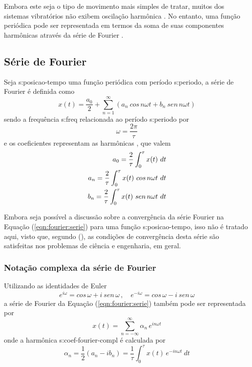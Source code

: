 \documentclass[12pt,openright,oneside,a4paper,
	chapter=TITLE,section=TITLE,
	english,brazil]{abntex2}
\begin{document}
	Embora este seja o tipo de movimento mais simples de tratar, muitos dos sistemas vibratórios não exibem oscilação harmônica \cite{rao:2008}. No entanto, uma função periódica pode ser representada em termos da soma de suas componentes harmônicas através da série de Fourier \cite{clark:1972}.
	
	\subsection{Série de Fourier}
	Seja \gls{s:posicao-tempo} uma função periódica com período \gls{s:periodo}, a série de Fourier é definida como \cite{spiegel:1977}
	\begin{equation}\label{eqn:fourier:serie}
		x(t) = \frac{a_0}{2} + \sum_{n=1}^{\infty}\left(a_n\ cos\,n\omega t + b_n\ sen\,n\omega t \right)
	\end{equation}
	sendo a frequência \gls{s:freq} relacionada ao período \gls{s:periodo} por \cite{dimarogonas:1995}
	\begin{equation}\label{eqn:fourier:periodo}
		\omega = \frac{2\pi}{\tau}
	\end{equation}
	e os coeficientes  representam as harmônicas \cite{dimarogonas:1995}, que valem \cite{spiegel:1977}
	\begin{align}\label{eqn:fourier:coefs}
		a_0 = \frac{2}{\tau}\int_{0}^{\tau}x(t)\ dt \notag\\
		a_n = \frac{2}{\tau}\int_{0}^{\tau}x(t)\ cos\,n\omega t\ dt \\
		b_n = \frac{2}{\tau}\int_{0}^{\tau}x(t)\ sen\,n\omega t\ dt \notag
	\end{align}
	
	Embora seja possível a discussão sobre a convergência da série Fourier na Equação (\ref{eqn:fourier:serie}) para uma função \gls{s:posicao-tempo}, isso não é tratado aqui, visto que, segundo  (\citeyear{spiegel:1977}), as condições de convergência desta série são satisfeitas nos problemas de ciência e engenharia, em geral.
	
	\subsubsection{Notação complexa da série de Fourier} \label{sec:fourier:serie-complexa}
	Utilizando as identidades de Euler
	\begin{equation}\label{eqn:fourier:ident-euler}
		e^{i\omega} = cos\,\omega + i\ sen\,\omega\, , \quad e^{-i\omega} = cos\,\omega - i\ sen\,\omega
	\end{equation}
	a série de Fourier da Equação (\ref{eqn:fourier:serie}) também pode ser representada por \cite{spiegel:1977}
	\begin{equation}\label{eqn:fourier:serie-compl}
		x(t) = \sum_{n=-\infty}^{\infty}\alpha_n\,e^{in\omega t}
	\end{equation}
	onde a harmônica \gls{s:coef-fourier-compl} é calculada por \cite{dimarogonas:1995}
	\begin{equation}\label{eqn:fourier:coefs-compl}
		\alpha_n = \frac{1}{2}(a_n - ib_n) = \frac{1}{\tau}\int_{0}^{\tau}x(t)\,e^{-in\omega t}\ dt
	\end{equation}
	
\end{document}
